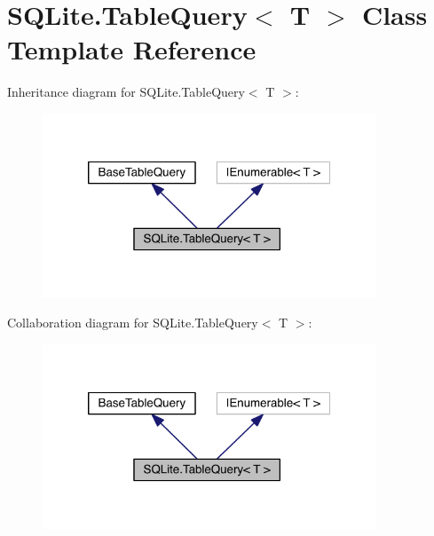 \hypertarget{class_s_q_lite_1_1_table_query_3_01_t_01_4}{\section{S\+Q\+Lite.\+Table\+Query$<$ T $>$ Class Template Reference}
\label{class_s_q_lite_1_1_table_query_3_01_t_01_4}
}


Inheritance diagram for S\+Q\+Lite.\+Table\+Query$<$ T $>$\+:
\nopagebreak
\begin{figure}[H]
\begin{center}
\leavevmode
\includegraphics[width=282pt]{class_s_q_lite_1_1_table_query_3_01_t_01_4__inherit__graph}
\end{center}
\end{figure}


Collaboration diagram for S\+Q\+Lite.\+Table\+Query$<$ T $>$\+:
\nopagebreak
\begin{figure}[H]
\begin{center}
\leavevmode
\includegraphics[width=282pt]{class_s_q_lite_1_1_table_query_3_01_t_01_4__coll__graph}
\end{center}
\end{figure}
